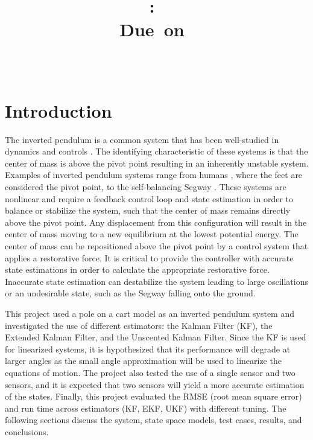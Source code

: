 \documentclass{article}
\title{
\vspace{2in}
\textmd{\textbf{\hmwkClass:\ \hmwkTitle}}\\
\normalsize\vspace{0.1in}\large{Due\ on\ \hmwkDueDate}\\
\vspace{0.1in}\large{\textit{\hmwkClassInstructor\ \hmwkClassTime}}\\
\vspace{3in}
}
\author{\textbf{\hmwkAuthorName}}
\date{} %
\begin{document}
\maketitle



\newpage
\tableofcontents
\listoffigures
\listoftables
\newpage

\section{Introduction}

 The inverted pendulum is a common system that has been well-studied in dynamics and controls \cite{boubaker2012inverted}.  The identifying characteristic of these systems is that the center of mass is above the pivot point resulting in an inherently unstable system.  Examples of inverted pendulum systems range from humans \cite{winter1995human}, where the feet are considered the pivot point, to the self-balancing Segway \cite{pathak2005velocity}.  These systems are nonlinear and require a feedback control loop and state estimation in order to balance or stabilize the system, such that the center of mass remains directly above the pivot point.  Any displacement from this configuration will result in the center of mass moving to a new equilibrium at the lowest potential energy.  The center of mass can be repositioned above the pivot point by a control system that applies a restorative force.  It is critical to provide the controller with accurate state estimations in order to calculate the appropriate restorative force.  Inaccurate state estimation can destabilize the system leading to large oscillations or an undesirable state, such as the Segway falling onto the ground.

 This project used a pole on a cart model as an inverted pendulum system and investigated the use of different estimators: the Kalman Filter (KF), the Extended Kalman Filter, and the Unscented Kalman Filter.  Since the KF is used for linearized systems, it is hypothesized that its performance will degrade at larger angles as the small angle approximation will be used to linearize the equations of motion.  The project also tested the use of a single sensor and two sensors, and it is expected that two sensors will yield a more accurate estimation of the states.  Finally, this project evaluated the RMSE (root mean square error) and run time across estimators (KF, EKF, UKF) with different tuning.  The following sections discuss the system, state space models, test cases, results, and conclusions.
\end{document}
